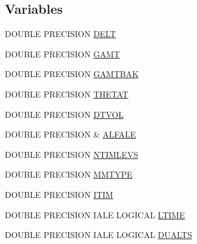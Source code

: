 \subsection*{Variables}
\begin{DoxyCompactItemize}
\item 
D\-O\-U\-B\-L\-E P\-R\-E\-C\-I\-S\-I\-O\-N \hyperlink{home_2abonfi_2_c_f_d__codes_2_eul_f_s_83_84_2include_2time_8com_acb1f2f1a9ae66911a5f4605d8be61030}{D\-E\-L\-T}
\item 
D\-O\-U\-B\-L\-E P\-R\-E\-C\-I\-S\-I\-O\-N \hyperlink{home_2abonfi_2_c_f_d__codes_2_eul_f_s_83_84_2include_2time_8com_a13b288a3cbd362cd91ab8edbfe0c08ee}{G\-A\-M\-T}
\item 
D\-O\-U\-B\-L\-E P\-R\-E\-C\-I\-S\-I\-O\-N \hyperlink{home_2abonfi_2_c_f_d__codes_2_eul_f_s_83_84_2include_2time_8com_a5832cc11ac78d197940380fea61f4fab}{G\-A\-M\-T\-B\-A\-K}
\item 
D\-O\-U\-B\-L\-E P\-R\-E\-C\-I\-S\-I\-O\-N \hyperlink{home_2abonfi_2_c_f_d__codes_2_eul_f_s_83_84_2include_2time_8com_aab3d96e8870d35dbccab4b309adb28e8}{T\-H\-E\-T\-A\-T}
\item 
D\-O\-U\-B\-L\-E P\-R\-E\-C\-I\-S\-I\-O\-N \hyperlink{home_2abonfi_2_c_f_d__codes_2_eul_f_s_83_84_2include_2time_8com_a00486054a38d678ac27310774f9c3d36}{D\-T\-V\-O\-L}
\item 
D\-O\-U\-B\-L\-E P\-R\-E\-C\-I\-S\-I\-O\-N \& \hyperlink{home_2abonfi_2_c_f_d__codes_2_eul_f_s_83_84_2include_2time_8com_a24382882bb714420b6325844b20852e4}{A\-L\-F\-A\-L\-E}
\item 
D\-O\-U\-B\-L\-E P\-R\-E\-C\-I\-S\-I\-O\-N \hyperlink{home_2abonfi_2_c_f_d__codes_2_eul_f_s_83_84_2include_2time_8com_a2ca5d60c37515ae15ddd21e5da9abcf1}{N\-T\-I\-M\-L\-E\-V\-S}
\item 
D\-O\-U\-B\-L\-E P\-R\-E\-C\-I\-S\-I\-O\-N \hyperlink{home_2abonfi_2_c_f_d__codes_2_eul_f_s_83_84_2include_2time_8com_a8ef2ef40e44d2eb096b5c209f6d0b1bc}{M\-M\-T\-Y\-P\-E}
\item 
D\-O\-U\-B\-L\-E P\-R\-E\-C\-I\-S\-I\-O\-N \hyperlink{home_2abonfi_2_c_f_d__codes_2_eul_f_s_83_84_2include_2time_8com_a404869822c8c75b527e76a2cc66add73}{I\-T\-I\-M}
\item 
D\-O\-U\-B\-L\-E P\-R\-E\-C\-I\-S\-I\-O\-N I\-A\-L\-E L\-O\-G\-I\-C\-A\-L \hyperlink{home_2abonfi_2_c_f_d__codes_2_eul_f_s_83_84_2include_2time_8com_ac761db16f3bf53bd70f0a5b7409bb16f}{L\-T\-I\-M\-E}
\item 
D\-O\-U\-B\-L\-E P\-R\-E\-C\-I\-S\-I\-O\-N I\-A\-L\-E L\-O\-G\-I\-C\-A\-L \hyperlink{home_2abonfi_2_c_f_d__codes_2_eul_f_s_83_84_2include_2time_8com_ad3e2a359298b8c2047bc080921eedfef}{D\-U\-A\-L\-T\-S}

\end{DoxyCompactItemize}
